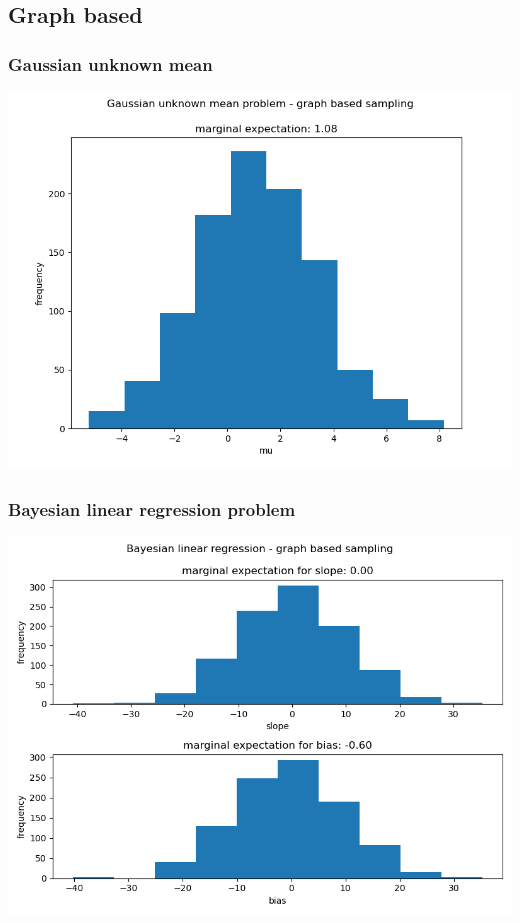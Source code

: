 \documentclass[10pt]{homeworg}
\begin{document}
\subsection{Graph based}
\subsubsection{Gaussian unknown mean}
\begin{center}
\includegraphics[scale=0.5]{figures/graph_1.png}
\end{center}

\subsubsection{Bayesian linear regression problem}
\begin{center}
\includegraphics[scale=0.5]{figures/graph_2}
\end{center}
\end{document}
